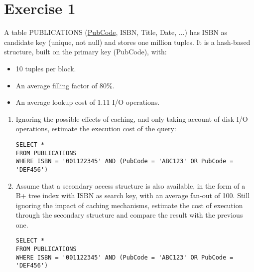 \section{Exercise 1}

A table
PUBLICATIONS (\underline{PubCode}, ISBN, Title, Date, $\dots$)
has ISBN as candidate key (unique, not null) and stores one million tuples.
It is a hash-based structure, built on the primary key (PubCode), with:
\begin{itemize}
    \item 10 tuples per block. 
    \item An average filling factor of 80\%. 
    \item An average lookup cost of 1.11 I/O operations. 
\end{itemize}
\begin{enumerate}
    \item Ignoring the possible effects of caching, and only taking account of disk I/O operations, estimate the execution cost of the query:
        \begin{lstlisting}[style=SQL]
SELECT *
FROM PUBLICATIONS
WHERE ISBN = '001122345' AND (PubCode = 'ABC123' OR PubCode = 'DEF456')
        \end{lstlisting}
    \item Assume that a secondary access structure is also available, in the form of a B+ tree index with ISBN as search key, with an average fan-out of 100.
        Still ignoring the impact of caching mechanisms, estimate the cost of execution through the secondary structure and compare the result with the previous one.
        \begin{lstlisting}[style=SQL]
SELECT * 
FROM PUBLICATIONS
WHERE ISBN = '001122345' AND (PubCode = 'ABC123' OR PubCode = 'DEF456')
        \end{lstlisting}
\end{enumerate}

